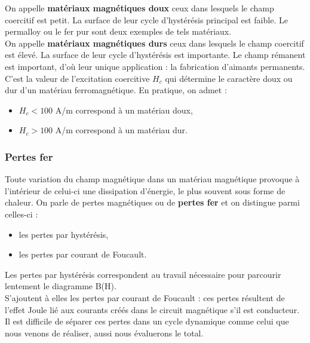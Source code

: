 \documentclass[11pt,a4paper]{report}
\begin{document}
On appelle \textbf{matériaux magnétiques doux} ceux dans lesquels le champ coercitif est petit. La surface de leur cycle d'hystérésis principal est faible. Le permalloy ou le fer pur sont deux exemples de tels matériaux.\\

On appelle \textbf{matériaux magnétiques durs} ceux dans lesquels le champ coercitif est élevé. La surface de leur cycle d'hystérésis est importante. Le champ rémanent est important, d'où leur unique application : la fabrication d'aimants permanents.\\

C'est la valeur de l'excitation coercitive $H_c$ qui détermine le caractère doux ou dur d'un matériau ferromagnétique. En pratique, on admet :\\
\begin{itemize}
	\item $H_c < 100$ A/m correspond à un matériau doux,
	\item $H_c > 100$ A/m correspond à un matériau dur.
\end{itemize}

\newpage
\subsubsection{Pertes fer}

Toute variation du champ magnétique dans un matériau magnétique provoque à l'intérieur de celui-ci une dissipation d'énergie, le plus souvent sous forme de chaleur. On parle de pertes magnétiques ou de \textbf{pertes fer} et on distingue parmi celles-ci :
\begin{itemize}
	\item les pertes par hystérésis,
	\item les pertes par courant de Foucault.\\
\end{itemize}

Les pertes par hystérésis correspondent au travail nécessaire pour parcourir lentement le diagramme B(H).\\

S'ajoutent à elles les pertes par courant de Foucault : ces pertes résultent de l'effet Joule lié aux courants créés dans le circuit magnétique s'il est conducteur. Il est difficile de séparer ces pertes dans un cycle dynamique comme celui que nous venons de réaliser, aussi nous évaluerons le total.\\
\end{document}
